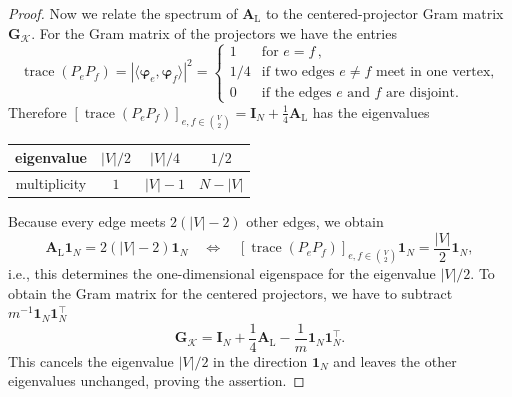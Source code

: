 \documentclass[10pt,a4paper]{amsart}
\DeclareMathOperator{\trace}{trace}
\begin{document}
\begin{proof}
    Now we relate the spectrum of $\bm A_{\mathrm L}$ to the centered-projector Gram matrix $\bm G_{\mathcal K}$.
    For the Gram matrix of the projectors we have the entries
    \begin{equation*}
        \trace(P_eP_f)
        = |\langle\bm\varphi_e,\bm\varphi_f\rangle|^2
        = \begin{cases} 1 & \text{for }e=f \,, \\ 1/4 & \text{if two edges } e\neq f \text{ meet in one vertex,}\\ 0 & \text{if the edges } e\text{ and } f \text{ are disjoint.}\end{cases}
    \end{equation*}
    Therefore $[\trace(P_eP_f)]_{e,f\in\binom{V}{2}} = \bm I_{N} + \frac 14 \bm A_{\mathrm L}$ has the eigenvalues
    \begin{center}
    \begin{tabular}{c|ccc}
        eigenvalue & $|V|/2$ & $|V|/4$ & $1/2$ \\
        \hline
        multiplicity & $1$ & $|V|-1$ & $N-|V|$
    \end{tabular}
    \end{center}
    Because every edge meets $2(|V|-2)$ other edges, we obtain
    \begin{equation*}
        \bm A_{\mathrm L}\bm 1_{N} = 2(|V|-2)\bm 1_{N}
        \quad\Leftrightarrow\quad
        [\trace(P_eP_f)]_{e,f\in\binom{V}{2}}\bm 1_{N}
        = \frac{|V|}{2}\bm 1_{N} ,
    \end{equation*}
    i.e., this determines the one-dimensional eigenspace for the eigenvalue $|V|/2$.
    To obtain the Gram matrix for the centered projectors, we have to subtract $m^{-1}\bm 1_N\bm 1_N^\top$
    \begin{equation*}
        \bm G_{\mathcal K}
        = \bm I_{N} + \frac 14 \bm A_{\mathrm L} - \frac 1m\bm 1_{N}\bm 1_{N}^\top .
    \end{equation*}
    This cancels the eigenvalue ${|V|}/2$ in the direction $\bm 1_N$ and leaves the other eigenvalues unchanged, proving the assertion.
\end{proof}
\end{document}
